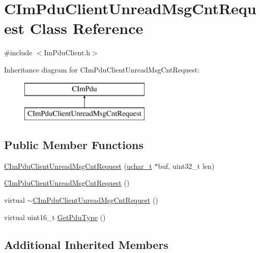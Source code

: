 \hypertarget{class_c_im_pdu_client_unread_msg_cnt_request}{}\section{C\+Im\+Pdu\+Client\+Unread\+Msg\+Cnt\+Request Class Reference}
\label{class_c_im_pdu_client_unread_msg_cnt_request}


{\ttfamily \#include $<$Im\+Pdu\+Client.\+h$>$}

Inheritance diagram for C\+Im\+Pdu\+Client\+Unread\+Msg\+Cnt\+Request\+:\begin{figure}[H]
\begin{center}
\leavevmode
\includegraphics[height=2.000000cm]{class_c_im_pdu_client_unread_msg_cnt_request}
\end{center}
\end{figure}
\subsection*{Public Member Functions}
\begin{DoxyCompactItemize}
\item 
\hyperlink{class_c_im_pdu_client_unread_msg_cnt_request_a9f6fb17bcff22009ba1481e4c0ca728f}{C\+Im\+Pdu\+Client\+Unread\+Msg\+Cnt\+Request} (\hyperlink{base_2ostype_8h_a124ea0f8f4a23a0a286b5582137f0b8d}{uchar\+\_\+t} $\ast$buf, uint32\+\_\+t len)
\item 
\hyperlink{class_c_im_pdu_client_unread_msg_cnt_request_aef1aaf2650b707de78c00c8154f7759f}{C\+Im\+Pdu\+Client\+Unread\+Msg\+Cnt\+Request} ()
\item 
virtual \hyperlink{class_c_im_pdu_client_unread_msg_cnt_request_a301abe7cd041b04b891041c2e6a22222}{$\sim$\+C\+Im\+Pdu\+Client\+Unread\+Msg\+Cnt\+Request} ()
\item 
virtual uint16\+\_\+t \hyperlink{class_c_im_pdu_client_unread_msg_cnt_request_a9ed0962d441bfa7417727707583c98fa}{Get\+Pdu\+Type} ()
\end{DoxyCompactItemize}
\subsection*{Additional Inherited Members}


